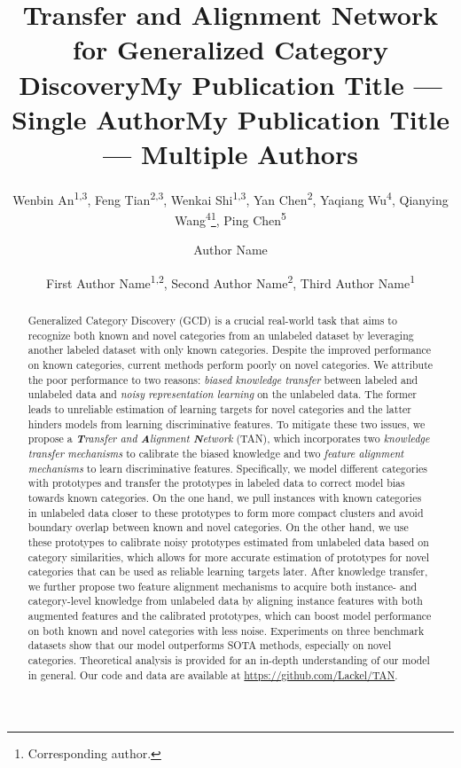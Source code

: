 \documentclass[letterpaper]{article} %
\title{Transfer and Alignment Network for Generalized Category Discovery}
\author{
    Wenbin An\textsuperscript{\rm 1,3}, Feng Tian\textsuperscript{\rm 2,3}\footnotemark[1], Wenkai Shi\textsuperscript{\rm 1,3}, Yan Chen\textsuperscript{\rm 2}, Yaqiang Wu\textsuperscript{\rm 4}, Qianying Wang\textsuperscript{\rm 4}\thanks{Corresponding author.}, Ping Chen\textsuperscript{\rm 5}\\
}
\title{My Publication Title --- Single Author}
\author {
    Author Name
}
\title{My Publication Title --- Multiple Authors}
\author {
    First Author Name\textsuperscript{\rm 1,\rm 2},
    Second Author Name\textsuperscript{\rm 2},
    Third Author Name\textsuperscript{\rm 1}
}
\begin{document}
\maketitle
\begin{abstract}
Generalized Category Discovery (GCD) is a crucial real-world task that aims to recognize both known and novel categories from an unlabeled dataset by leveraging another labeled dataset with only known categories. 
Despite the improved performance on known categories, current methods perform poorly on novel categories. 
We attribute the poor performance to two reasons: \textit{biased knowledge transfer} between labeled and unlabeled data and \textit{noisy representation learning} on the unlabeled data. The former leads to unreliable estimation of learning targets for novel categories and the latter hinders models from learning discriminative features.
To mitigate these two issues, we propose a \textit{\textbf{T}ransfer and \textbf{A}lignment \textbf{N}etwork} (TAN), which incorporates two \textit{knowledge transfer mechanisms} to calibrate the biased knowledge and two \textit{feature alignment mechanisms} to learn discriminative features.
Specifically, we model different categories with prototypes and transfer the prototypes in labeled data to correct model bias towards known categories.
On the one hand, we pull instances with known categories in unlabeled data closer to these prototypes to form more compact clusters and avoid boundary overlap between known and novel categories. On the other hand, we use these prototypes to calibrate noisy prototypes estimated from unlabeled data based on category similarities, which allows for more accurate estimation of prototypes for novel categories that can be used as reliable learning targets later.
After knowledge transfer, we further propose two feature alignment mechanisms to acquire both instance- and category-level knowledge from unlabeled data by aligning instance features with both augmented features and the calibrated prototypes, which can boost model performance on both known and novel categories with less noise.
Experiments on three benchmark datasets show that our model outperforms SOTA methods, especially on novel categories. Theoretical analysis is provided for an in-depth understanding of our model in general.
Our code and data are available at \url{https://github.com/Lackel/TAN}.

\end{abstract}
\end{document}

